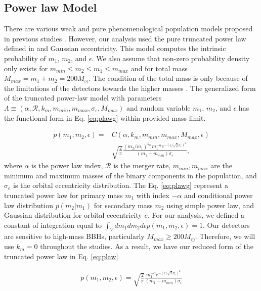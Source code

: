 \documentclass[twocolumn,prd,nofootinbib]{revtex4}
\begin{document}
\subsection{Power law Model}
There are various weak and pure phenomenological population models proposed in previous studies \cite{2016PRXAbbot_BBH_model,2017FishBach_BBH_model,2018talbot_bbh_model}. However, our analysis used the pure truncated power law defined in \cite{2016PRXAbbot_BBH_model,2017FishBach_BBH_model} and Gaussian eccentricity. This model computes the intrinsic probability of $m_1$, $m_2$, and $\epsilon$.  
We also assume that non-zero probability density only exists for $m_{min}\leq m_2 \leq m_1 \leq m_{max}$ and for total mass $M_{max}=m_1+m_2 = 200 M_\odot$. The condition of the total mass is only because of the limitations of the detectors towards the higher masses \cite{2016PRXAbbot_BBH_model}. The generalized form of the truncated power-law model with parameters $\Lambda \equiv  (\alpha, \mathcal{R}, k_m, m_{min}, m_{max}, \sigma_\epsilon, M_{max})$ and random variable $m_1$, $m_2$, and $\epsilon$ has the functional form in Eq. \ref{eq:plawg} within provided mass limit.


\begin{align}
\label{eq:plawg}
p(m_1,m_2,\epsilon) = &C(\alpha,k_m,m_{min},m_{max},M_{max},\epsilon)  
\nonumber \\ & \sqrt{\frac{2}{\pi}} \frac{(m_2/m_1)^{k_m} m_1^{-\alpha} e^{-(\epsilon/\sqrt{2}\sigma_\epsilon)^2}}{(m_1-m_{min})\sigma_\epsilon},
\end{align}
%
where $\alpha$ is the power law index, $\mathcal{R}$ is the merger rate, $m_{min}, m_{max}$ are the minimum and maximum masses of the binary components in the population, and $\sigma_e$ is the orbital eccentricity distribution. The Eq. \ref{eq:plawg} represent a truncated power law for primary mass $m_1$ with index $-\alpha$ and conditional power law distribution $p(m_2|m_1)$ for secondary mass $m_2$ using simple power law, and Gaussian distribution for orbital eccentricity $e$. 
For our analysis, we defined a constant of integration equal to $\int_V dm_1 dm_2 d\epsilon p(m_1,m_2,\epsilon) = 1$.  Our detectors are sensitive to high-mass BBHs, particularly $M_{max}\geq 200 M_\odot$. Therefore, we will use $k_m=0$ throughout the studies. As a result, we have our reduced form of the truncated power law in Eq. \ref{eq:plaw}

\begin{align}
\label{eq:plaw}
p(m_1,m_2,\epsilon) = \sqrt{\frac{2}{\pi}} \frac{ m_1^{-\alpha}  e^{-(\epsilon/\sqrt{2}\sigma_\epsilon)^2}}{(m_1-m_{min})\sigma_\epsilon}
\end{align}
\end{document}
